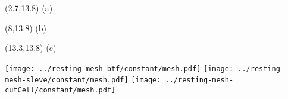 \documentclass{article}
\begin{document}
\TPMargin{2pt}
\begin{textblock}{0.5}(2.7,13.8)
\normalsize
(a)
\end{textblock}
\begin{textblock}{1}(8,13.8)
\normalsize
(b)
\end{textblock}
\begin{textblock}{1}(13.3,13.8)
\normalsize
(c)
\end{textblock}
\texttt{[image: ../resting-mesh-btf/constant/mesh.pdf]}
\texttt{[image: ../resting-mesh-sleve/constant/mesh.pdf]}
\texttt{[image: ../resting-mesh-cutCell/constant/mesh.pdf]}
\end{document}

